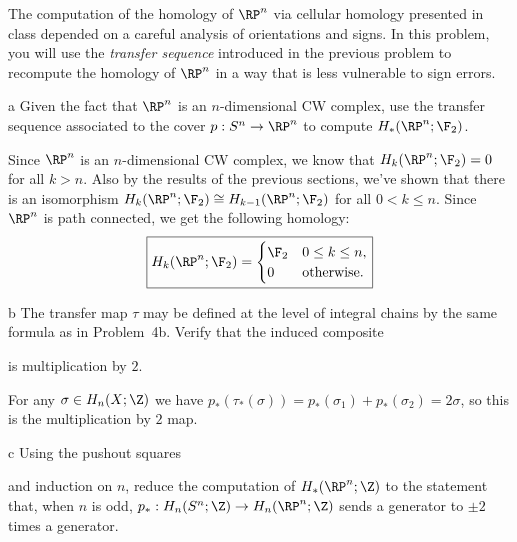\documentclass[11pt,letterpaper]{article}
\begin{document}
\begin{solution}
    \quad The computation of the homology of $\RP^n$ via cellular homology presented in class depended on a careful analysis of orientations and signs. In this problem, you will use the \emph{transfer sequence} introduced in the previous problem to recompute the homology of $\RP^n$ in a way that is less vulnerable to sign errors.
    \begin{partproblem}{a}
        Given the fact that $\RP^n$ is an $n$-dimensional CW complex, use the transfer sequence associated to the cover $p : S^n \to \RP^n$ to compute $H_*(\RP^n; \F_2)$.
    \end{partproblem}

    \quad Since $\RP^n$ is an $n$-dimensional CW complex, we know that $H_k(\RP^n; \F_2)=0$ for all $k>n$. Also by the results of the previous sections, we've shown that there is an isomorphism $H_k(\RP^n; \F_2)\cong H_{k-1}(\RP^n; \F_2)$ for all $0<k\leq n$. Since $\RP^n$ is path connected, we get the following homology:
    \[
        \boxed{H_k(\RP^n; \F_2) = \begin{cases}
            \F_2 & 0\leq k \leq n,\\
            0 & \text{otherwise}.\\
        \end{cases}}
    \] 

    \begin{partproblem}{b}
        The transfer map $\tau$ may be defined at the level of integral chains by the same formula as in Problem~4b. Verify that the induced composite
        \begin{center}
        \end{center}
        is multiplication by $2$.
    \end{partproblem}
    \quad For any $\sigma\in H_n(X; \Z)$ we have $p_*(\tau_*(\sigma))=p_*(\sigma_1)+p_*(\sigma_2)=2\sigma$, so this is the multiplication by $2$ map. 

    \begin{partproblem}{c}
        Using the pushout squares
        \begin{center}
        \end{center}
        and induction on $n$, reduce the computation of $H_*(\RP^n; \Z)$ to the statement that, when $n$ is odd, $p_* : H_n(S^n; \Z) \to H_n(\RP^n; \Z)$ sends a generator to $\pm 2$ times a generator. 
    \end{partproblem}


\end{solution}
\end{document}
